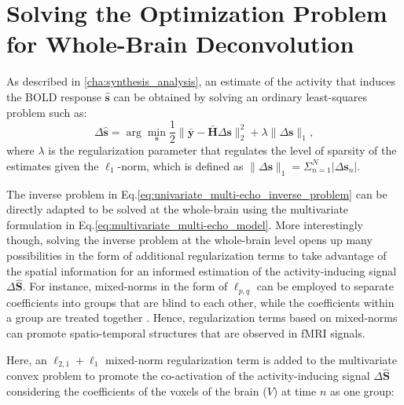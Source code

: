 \section{Solving the Optimization Problem for Whole-Brain Deconvolution}

As described in \cref{cha:synthesis_analysis}, an estimate of the activity that
induces the BOLD response $\hat{\mathbf{s}}$ can be obtained by solving an
ordinary least-squares problem such as:
\begin{equation}
    \Delta \hat{\mathbf{s}} = \arg \min_{\mathbf{s}} \frac{1}{2}
    \| \bar{\mathbf{y}} - \bar{\mathbf{H}} \Delta \mathbf{s} \|_2^2
    + \lambda \| \Delta \mathbf{s} \|_1,
\label{eq:univariate_multi-echo_inverse_problem}
\end{equation}
where $\lambda$ is the regularization parameter that regulates the level of
sparsity of the estimates given the $\ell_1$-norm, which is defined as $\|
\Delta \mathbf{s} \|_1 = \Sigma_{n=1}^{N} | \Delta \mathbf{s}_n |$.

The inverse problem in Eq.\eqref{eq:univariate_multi-echo_inverse_problem} can
be directly adapted to be solved at the whole-brain using the multivariate
formulation in Eq.\eqref{eq:multivariate_multi-echo_model}. More interestingly
though, solving the inverse problem at the whole-brain level opens up many
possibilities in the form of additional regularization terms to take advantage
of the spatial information for an informed estimation of the activity-inducing
signal $\Delta\hat{\mathbf{S}}$. For instance, mixed-norms in the form of
$\ell_{p,q}$ can be employed to separate coefficients into groups that are blind
to each other, while the coefficients within a group are treated together
\citep{Kowalski2009Sparseregressionusing}. Hence, regularization terms based on
mixed-norms can promote spatio-temporal structures that are observed in fMRI
signals. 

Here, an $\ell_{2,1} + \ell_1$ mixed-norm regularization term
\citep{Gramfort2011FunctionalBrainImaging} is added to the multivariate convex
problem to promote the co-activation of the activity-inducing signal
$\Delta\hat{\mathbf{S}}$ considering the coefficients of the voxels of the brain
($V$) at time $n$ as one group:

